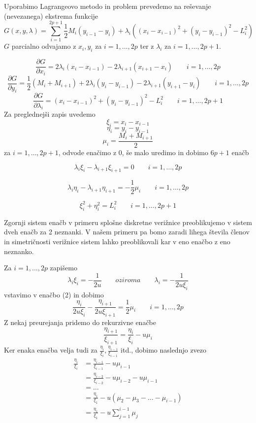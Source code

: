 \documentclass[A4paper, 11pt]{article}
\begin{document}
Uporabimo Lagrangeovo metodo in problem prevedemo na reševanje (nevezanega) ekstrema funkcije
\[ G(x,y,\lambda) = \sum_{i=1}^{2p+1} \frac{1}{2} M_i (y_{i-1} - y_i) + \lambda_i ((x_i - x_{i-1})^2 + (y_i - y_{i-1})^2 - L_i ^2) \]
$G$ parcialno odvajamo z $x_i, y_i$ za $i=1, \ldots, 2p$ ter z $\lambda_i$ za $i=1, \ldots, 2p+1$.

\[ \frac{\partial G}{\partial x_i} = 2\lambda_i (x_i - x_{i-1}) - 2\lambda_{i+1} (x_{i+1} - x_i) \qquad i=1, \ldots, 2p \]
\[ \frac{\partial G}{\partial y_i} = \frac{1}{2} (M_i + M_{i+1}) + 2\lambda_i (y_i - y_{i-1}) - 2\lambda_{i+1} (y_{i+1} - y_i) \qquad  i=1, \ldots, 2p \]
\[ \frac{\partial G}{\partial \lambda_i} = (x_i - x_{i-1})^2 + (y_i - y_{i-1})^2 - L_i ^2 \qquad i=1, \ldots, 2p+1 \]
Za preglednejši zapis uvedemo 
\[ \xi_i = x_i - x_{i-1} \]
\[ \eta_i = y_i - y_{i-1} \]
\[ \mu_i = \frac{M_i + M_{i+1}}{2} \] 
za $i=1, \ldots, 2p+1$, odvode enačimo z 0, še malo uredimo in dobimo $6p+1$ enačb

\begin{equation}
\lambda_i \xi_i - \lambda_{i+1} \xi_{i+1} = 0 \qquad i=1, \ldots, 2p 
\end{equation}

\begin{equation}
\lambda_i \eta_i - \lambda_{i+1} \eta_{i+1} = - \frac{1}{2} \mu_i \qquad i=1, \ldots, 2p 
\end{equation}

\begin{equation}
\xi_i ^2 + \eta_i ^2 = L_i ^2 \qquad i=1, \ldots, 2p+1 
\end{equation}

Zgornji sistem enačb v primeru splošne diskretne verižnice preoblikujemo v sistem dveh enačb za 2 neznanki. V našem primeru pa bomo zaradi lihega števila členov in simetričnosti verižnice sistem lahko preoblikovali kar v eno enačbo z eno neznanko. 

Za $i=1, \ldots, 2p$ zapišemo
\[ \lambda_i \xi_i = - \frac{1}{2u} \qquad oziroma \qquad \lambda_i = - \frac{1}{2u \xi_i}  \]
vstavimo v enačbo (2) in dobimo
\[ \frac{\eta_i}{2u \xi_i} - \frac{\eta_{i+1}}{2u \xi_{i+1}} = \frac{1}{2} \mu_i \qquad i=1, \ldots, 2p \]
Z nekaj preurejanja pridemo do rekurzivne enačbe
\[ \frac{\eta_{i+1}}{\xi_{i+1}} =  \frac{\eta_i}{\xi_i} - u \mu_i \]
Ker enaka enačba velja tudi za $\frac{\eta_i}{\xi_i}, \frac{\eta_{i-1}}{\xi_{i-1}}$ itd., dobimo naslednjo zvezo
\begin{equation}
\begin{split}
\frac{\eta_{i}}{\xi_{i}} & =  \frac{\eta_{i-1}}{\xi_{i-1}} - u \mu_{i-1}  \\
                                               & =  \frac{\eta_{i-2}}{\xi_{i-2}} - u \mu_{i-2} - u \mu_{i-1}  \\
                                               & = \ldots  \\
                                               & = \frac{\eta_1}{\xi_1} - u (\mu_2 - \mu_3 - \ldots - \mu_{i-1})  \\
                                               & = \frac{\eta_1}{\xi_1} - u \sum_{j=1}^{i-1} \mu_j
\end{split}
\end{equation}
\end{document}
